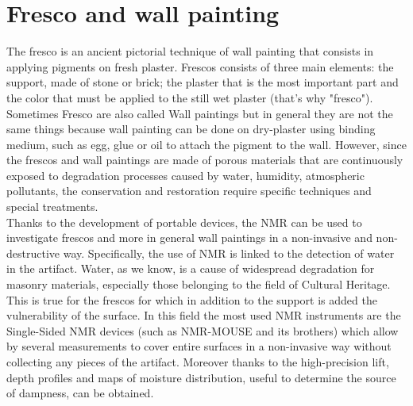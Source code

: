 \documentclass[a4paper,11pt]{report}
\begin{document}
\section{Fresco and wall painting}

The fresco is an ancient pictorial technique of wall painting that consists in applying pigments on fresh plaster. Frescos consists of three main elements: the support, made of stone or brick; the plaster that is the most important part and the color that must be applied to the still wet plaster (that's why "fresco"). 
Sometimes Fresco are also called Wall paintings but in general they are not the same things because wall painting can be done on dry-plaster using binding medium, such as egg, glue or oil to attach the pigment to the wall.
However, since the frescos and wall paintings are made of porous materials that are continuously exposed to degradation processes caused by water, humidity, atmospheric pollutants, the conservation and restoration require specific techniques and special treatments\cite{unofresco}. \\
Thanks to the development of portable devices, the NMR can be used to investigate frescos and more in general wall paintings in a non-invasive and non-destructive way. Specifically, the use of NMR is linked to the detection of water in the artifact. Water, as we know, is a cause of widespread degradation for masonry materials, especially those belonging to the field of Cultural Heritage. This is true for the frescos for which in addition to the support is added the vulnerability of the surface. In this field the most used NMR instruments are the Single-Sided NMR devices (such as NMR-MOUSE and its brothers) which allow by several measurements to cover entire surfaces in a non-invasive way without collecting any pieces of the artifact. Moreover thanks to the high-precision lift, depth profiles and  maps of moisture distribution, useful to determine the source of dampness, can be obtained.\\
\end{document}
